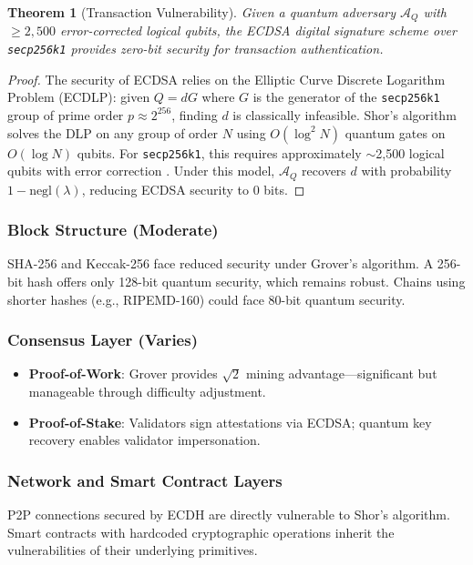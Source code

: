 \documentclass[12pt, a4paper, twocolumn]{article}
\newtheorem{theorem}{Theorem}
\begin{document}
\begin{theorem}[Transaction Vulnerability]
\label{thm:txvuln}
Given a quantum adversary $\mathcal{A}_Q$ with $\geq 2{,}500$ error-corrected logical qubits, the ECDSA digital signature scheme over \texttt{secp256k1} provides zero-bit security for transaction authentication.
\end{theorem}

\begin{proof}
The security of ECDSA relies on the Elliptic Curve Discrete Logarithm Problem (ECDLP): given $Q = dG$ where $G$ is the generator of the \texttt{secp256k1} group of prime order $p \approx 2^{256}$, finding $d$ is classically infeasible. Shor's algorithm solves the DLP on any group of order $N$ using $O(\log^2 N)$ quantum gates on $O(\log N)$ qubits. For \texttt{secp256k1}, this requires approximately $\sim$2,500 logical qubits with error correction \cite{roetteler2017quantum}. Under this model, $\mathcal{A}_Q$ recovers $d$ with probability $1 - \text{negl}(\lambda)$, reducing ECDSA security to 0 bits.
\end{proof}

\subsubsection{Block Structure (Moderate)}
SHA-256 and Keccak-256 face reduced security under Grover's algorithm. A 256-bit hash offers only 128-bit quantum security, which remains robust. Chains using shorter hashes (e.g., RIPEMD-160) could face 80-bit quantum security.

\subsubsection{Consensus Layer (Varies)}
\begin{itemize}[noitemsep]
  \item \textbf{Proof-of-Work}: Grover provides $\sqrt{2}$ mining advantage---significant but manageable through difficulty adjustment.
  \item \textbf{Proof-of-Stake}: Validators sign attestations via ECDSA; quantum key recovery enables validator impersonation.
\end{itemize}

\subsubsection{Network and Smart Contract Layers}
P2P connections secured by ECDH are directly vulnerable to Shor's algorithm. Smart contracts with hardcoded cryptographic operations inherit the vulnerabilities of their underlying primitives.
\end{document}
